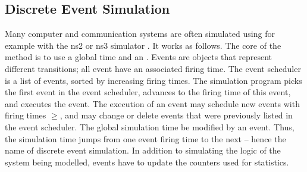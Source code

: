 \subsection{Discrete Event Simulation}
\begin{figure}[!htb]\begin{center}
 \end{center}
  
\end{figure}

Many computer and communication systems are often simulated
using  for example with the ns2
or ns3 simulator \cite{ns3}. It works as follows. The core of
the method is to use a global time  and an
. Events are objects that represent
different transitions; all event have an associated firing
time. The event scheduler is a list of events, sorted by
increasing firing times. The simulation program picks the first
event in the event scheduler, advances  to the
firing time of this event, and executes the event. The
execution of an event may schedule new events with firing times
$\geq$, and may change or delete events that
were previously listed in the event scheduler. The global
simulation time   be modified by
an event. Thus, the simulation time jumps from one event firing
time to the next -- hence the name of discrete event
simulation. In addition to simulating the logic of the system
being modelled, events have to update the counters used for
statistics.


